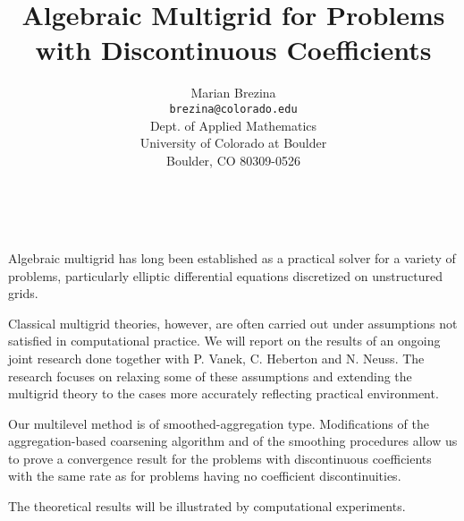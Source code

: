 \documentclass[11pt]{article}
\date{ ~ \hspace{-4mm}}
\title{Algebraic Multigrid for Problems with Discontinuous Coefficients   }
\author{Marian Brezina \\ {\tt brezina@colorado.edu} \\ Dept. of Applied Mathematics \\ University of Colorado at Boulder \\ Boulder, CO 80309-0526}
\begin{document}
\maketitle
\thispagestyle{empty}





 



Algebraic multigrid has long been established as a practical solver 
for a variety of problems, particularly elliptic differential
equations discretized on unstructured grids. 



Classical multigrid theories, however, are often carried out under 
assumptions not satisfied in computational practice. 
We will report on the results of an ongoing joint research done together 
with P. Vanek, C. Heberton and N. Neuss.   The research focuses on 
relaxing some of these assumptions and extending the multigrid theory 
to the cases more accurately reflecting practical environment. 



Our multilevel method is of smoothed-aggregation type. 
Modifications of the aggregation-based coarsening algorithm and of the 
smoothing procedures allow us to prove a convergence result for the 
problems with discontinuous coefficients with the same rate as for 
problems having no coefficient discontinuities.  



The theoretical results will be illustrated by computational experiments. 
\end{document}
